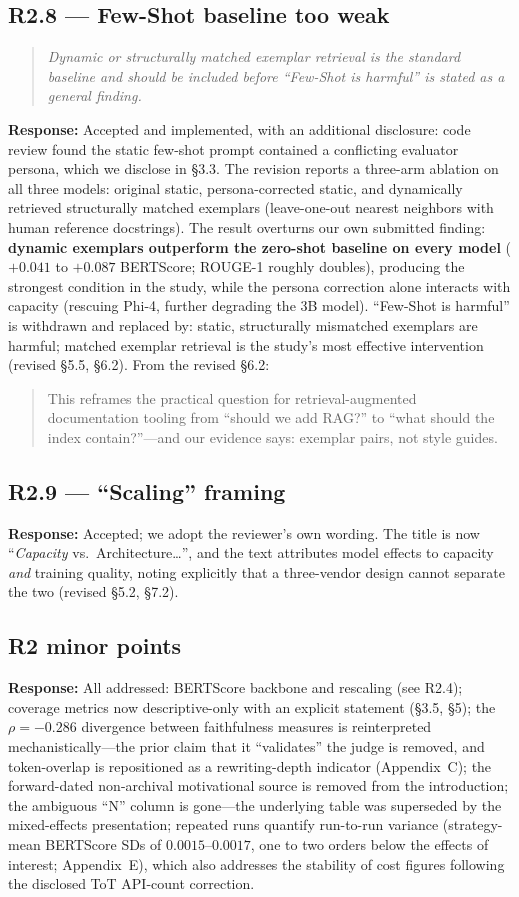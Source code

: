\documentclass[11pt]{article}
\newcommand{\rcomment}[1]{\begin{quote}\itshape\color{black!70}#1\end{quote}}
\newcommand{\resp}{\noindent\textbf{Response:} }
\newcommand{\excerpt}[1]{\begin{quote}\small\color{blue!70!black}#1\end{quote}}
\begin{document}
\subsection*{R2.8 --- Few-Shot baseline too weak}
\rcomment{Dynamic or structurally matched exemplar retrieval is the standard baseline and should be included before ``Few-Shot is harmful'' is stated as a general finding.}
\resp Accepted and implemented, with an additional disclosure: code review found the static few-shot prompt contained a conflicting evaluator persona, which we disclose in \S3.3. The revision reports a three-arm ablation on all three models: original static, persona-corrected static, and dynamically retrieved structurally matched exemplars (leave-one-out nearest neighbors with human reference docstrings). The result overturns our own submitted finding: \textbf{dynamic exemplars outperform the zero-shot baseline on every model} ($+0.041$ to $+0.087$ BERTScore; ROUGE-1 roughly doubles), producing the strongest condition in the study, while the persona correction alone interacts with capacity (rescuing Phi-4, further degrading the 3B model). ``Few-Shot is harmful'' is withdrawn and replaced by: static, structurally mismatched exemplars are harmful; matched exemplar retrieval is the study's most effective intervention (revised \S5.5, \S6.2). From the revised \S6.2:
\excerpt{This reframes the practical question for retrieval-augmented documentation tooling from ``should we add RAG?'' to ``what should the index contain?''---and our evidence says: exemplar pairs, not style guides.}

\subsection*{R2.9 --- ``Scaling'' framing}
\resp Accepted; we adopt the reviewer's own wording. The title is now ``\emph{Capacity} vs.\ Architecture\dots'', and the text attributes model effects to capacity \emph{and} training quality, noting explicitly that a three-vendor design cannot separate the two (revised \S5.2, \S7.2).

\subsection*{R2 minor points}
\resp All addressed: BERTScore backbone and rescaling (see R2.4); coverage metrics now descriptive-only with an explicit statement (\S3.5, \S5); the $\rho=-0.286$ divergence between faithfulness measures is reinterpreted mechanistically---the prior claim that it ``validates'' the judge is removed, and token-overlap is repositioned as a rewriting-depth indicator (Appendix~C); the forward-dated non-archival motivational source is removed from the introduction; the ambiguous ``N'' column is gone---the underlying table was superseded by the mixed-effects presentation; repeated runs quantify run-to-run variance (strategy-mean BERTScore SDs of $0.0015$--$0.0017$, one to two orders below the effects of interest; Appendix~E), which also addresses the stability of cost figures following the disclosed ToT API-count correction.
\end{document}
